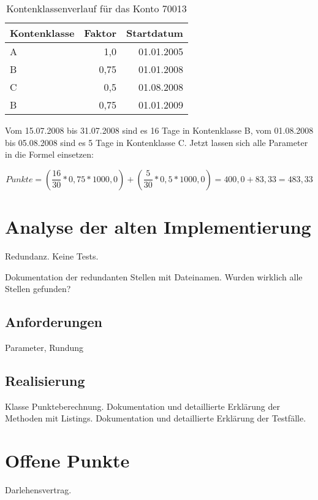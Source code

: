\documentclass[12pt]{scrreprt}
\begin{document}
\begin{table}
  \begin{center}
    \begin{tabular}{|l|r|r|}
      \hline
      \textbf{Kontenklasse} & \textbf{Faktor} & \textbf{Startdatum}\\
      \hline
      A & 1,0 & 01.01.2005\\
      \hline
      B & 0,75 & 01.01.2008\\
      \hline
      C & 0,5 & 01.08.2008\\
      \hline
      B & 0,75 & 01.01.2009\\
      \hline
    \end{tabular}
    \caption{Kontenklassenverlauf für das Konto 70013}
  \end{center}
\end{table}
\vspace{2mm}

Vom 15.07.2008 bis 31.07.2008 sind es 16 Tage in Kontenklasse B, vom 01.08.2008 bis 05.08.2008 sind es  5 Tage in Kontenklasse C. Jetzt lassen sich alle Parameter in die Formel einsetzen:

\begin{equation*}
  Punkte = \left(\frac{16}{30} * 0,75 * 1000,0\right) + \left(\frac{5}{30} * 0,5 * 1000,0\right) = 400,0 + 83,33 = 483,33
\end{equation*}

\newpage




\section{Analyse der alten Implementierung}
Redundanz. 
Keine Tests.

Dokumentation der redundanten Stellen mit Dateinamen.
Wurden wirklich alle Stellen gefunden?

\subsection{Anforderungen}
Parameter, Rundung

\subsection{Realisierung}
Klasse Punkteberechnung.
Dokumentation und detaillierte Erklärung der Methoden mit Listings. 
Dokumentation und detaillierte Erklärung der Testfälle.

\section{Offene Punkte}
Darlehensvertrag.
\end{document}
